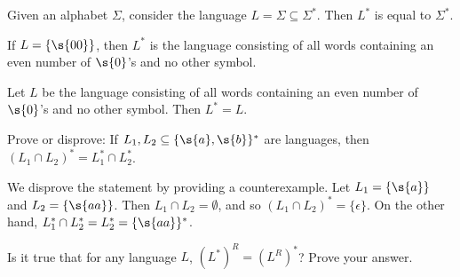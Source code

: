 \begin{example}[$\Sigma^*$] \label{example:Sigma-star}
Given an alphabet $\Sigma$, consider the language $L = \Sigma \subseteq \Sigma^*$. Then $L^*$ is equal to $\Sigma^*$.
\end{example}

\begin{example}[$\{00\}^*$] \label{example:00-star}
If $L = \{\s{00}\}$, then $L^*$ is the language consisting of all words containing an even number of $\s{0}$'s and no other symbol. 
\end{example}

\begin{example}[$(\{00\}^*)^*$] \label{example:00-starstar}
Let $L$ be the language consisting of all words containing an even number of $\s{0}$'s and no other symbol. Then $L^* = L$. 
\end{example}

\begin{exercise} \label{exercise:Can-you-distribute-star-over-intersection}
Prove or disprove: If $L_1, L_2 \subseteq \{\s{a},\s{b}\}^*$ are languages, then $(L_1 \cap L_2)^* = L_1^* \cap L_2^*$.
\end{exercise}

\begin{solution}
We disprove the statement by providing a counterexample. Let $L_1 = \{\s{a}\}$ and $L_2 = \{\s{aa}\}$. Then $L_1 \cap L_2 = \emptyset$, and so $(L_1 \cap L_2)^* = \{\epsilon\}$. On the other hand, $L_1^* \cap L_2^* = L_2^* = \{\s{aa}\}^*$.
\end{solution}

\begin{exercise} \label{exercise:Can-you-interchange-star-and-reversal}
Is it true that for any language $L$, $(L^*)^R = (L^R)^*$? Prove your answer.
\end{exercise}


